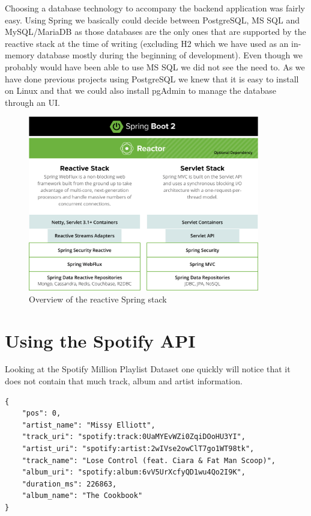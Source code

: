 Choosing a database technology to accompany the backend application was fairly easy. Using Spring we basically could decide between PostgreSQL, MS SQL and MySQL/MariaDB as those databases are the only ones that are supported by the reactive stack at the time of writing (excluding H2 which we have used as an in-memory database mostly during the beginning of development). Even though we probably would have been able to use MS SQL we did not see the need to. As we have done previous projects using PostgreSQL we knew that it is easy to install on Linux and that we could also install pgAdmin to manage the database through an \ac{UI}.

\begin{figure}[bth]
    \centering
    \includegraphics[width=0.9\textwidth]{Graphics/Chapter2/spring-stack.png}
    \caption{Overview of the reactive Spring stack \cite{SpringReactive}}
\end{figure}

\section{Using the Spotify API}

Looking at the Spotify Million Playlist Dataset one quickly will notice that it does not contain that much track, album and artist information.

\begin{lstlisting}[caption={Excerpt of one track entry in the Spotify Million Playlist Dataset}, style=Terminal]
{
    "pos": 0,
    "artist_name": "Missy Elliott",
    "track_uri": "spotify:track:0UaMYEvWZi0ZqiDOoHU3YI",
    "artist_uri": "spotify:artist:2wIVse2owClT7go1WT98tk",
    "track_name": "Lose Control (feat. Ciara & Fat Man Scoop)",
    "album_uri": "spotify:album:6vV5UrXcfyQD1wu4Qo2I9K",
    "duration_ms": 226863,
    "album_name": "The Cookbook"
}
\end{lstlisting}


